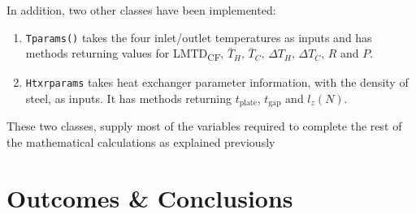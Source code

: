 \documentclass[12pt,letterpaper]{article}
\begin{document}
In addition, two other classes have been implemented:

\begin{enumerate}
\item \texttt{Tparams()} takes the four inlet/outlet temperatures as inputs and has methods returning values for LMTD\textsubscript{CF}, \(\bar{T}_H\), \(\bar{T}_C\), \(\Delta T_H\), \(\Delta T_C\), \(R\) and \(P\).
\item \texttt{Htxrparams} takes heat exchanger parameter information, with the density of steel, as inputs. It has methods returning \(t_{\textrm{plate}}\), \(t_{\textrm{gap}}\) and \(l_z(N)\).
\end{enumerate}

These two classes, supply most of the variables required to complete the rest of the mathematical calculations as explained previously

\section{Outcomes \& Conclusions}
\end{document}
